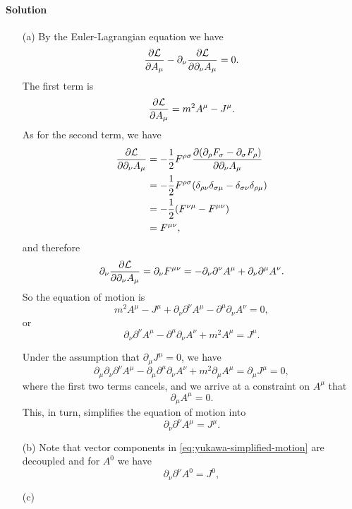 \documentclass[hyperref, a4paper]{article}
\begin{document}
\paragraph{Solution} \begin{itemize}
    \item[(a)] By the Euler-Lagrangian equation we have
    \[
        \pdv{\mathcal{L}}{A_\mu} - \partial_\nu \pdv{\mathcal{L}}{\partial_\nu A_\mu} = 0.
    \] 
    The first term is 
    \[
        \pdv{\mathcal{L}}{A_\mu} = m^2 A^\mu - J^\mu.
    \]
    As for the second term, we have
    \[
        \begin{aligned}
            \pdv{\mathcal{L}}{\partial_\nu A_\mu} &= - \frac{1}{2} F^{\rho \sigma} \pdv{(\partial_\rho F_\sigma - \partial_\sigma F_\rho)}{\partial_\nu A_\mu} \\
            &= - \frac{1}{2} F^{\rho \sigma} (\delta_{\rho \nu} \delta_{\sigma \mu} - \delta_{\sigma \nu} \delta_{\rho \mu}) \\
            &= - \frac{1}{2} (F^{\nu \mu} - F^{\mu \nu}) \\
            &= F^{\mu \nu},
        \end{aligned}
    \]
    and therefore
    \[
        \partial_\nu \pdv{\mathcal{L}}{\partial_\nu A_\mu} = \partial_\nu F^{\mu \nu} = - \partial_\nu \partial^\nu A^\mu + \partial_\nu \partial^\mu A^\nu.
    \]
    So the equation of motion is
    \[
        m^2 A^\mu - J^\mu + \partial_\nu \partial^\nu A^\mu - \partial^\mu \partial_\nu A^\nu = 0,
    \]
    or 
    \begin{equation}
        \partial_\nu \partial^\nu A^\mu - \partial^\mu \partial_\nu A^\nu + m^2 A^\mu = J^\mu.
    \end{equation}

    Under the assumption that $\partial_\mu J^\mu = 0$, we have
    \[
        \partial_\mu \partial_\nu \partial^\nu A^\mu - \partial_\mu \partial^\mu \partial_\nu A^\nu + m^2 \partial_\mu A^\mu = \partial_\mu J^\mu = 0,
    \]
    where the first two terms cancels, and we arrive at a constraint on $A^\mu$ that
    \begin{equation}
        \partial_\mu A^\mu = 0.
    \end{equation}
    This, in turn, simplifies the equation of motion into 
    \begin{equation}
        \partial_\nu \partial^\nu A^\mu = J^\mu.
        \label{eq:yukawa-simplified-motion}
    \end{equation}
    \item[(b)] Note that vector components in \eqref{eq:yukawa-simplified-motion} are decoupled and for $A^0$ we have
    \[
        \partial_\nu \partial^\nu A^0 = J^0,
    \] 
    \item[(c)]
\end{itemize}
\end{document}
